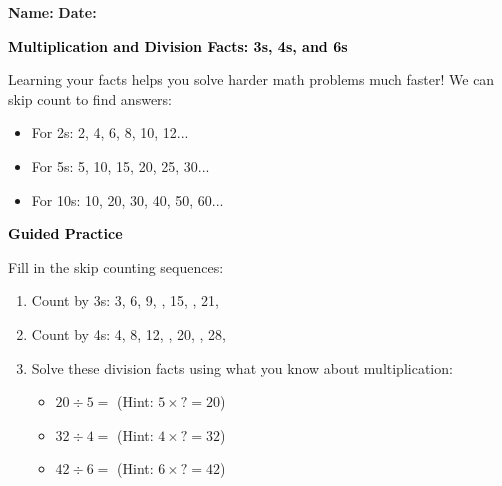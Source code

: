 \documentclass[12pt, letterpaper, fleqn]{article}
\newcommand{\blank}{\underline{\hspace{2.2cm}}}
\begin{document}
\textbf{Name:} \underline{\hspace{5cm}}
\hfill
\textbf{Date:} \underline{\hspace{3cm}}\\

\begin{tcolorbox}[colback=customteal!20]
    \large\textcolor{black}{\textbf{Multiplication and Division Facts: 3s, 4s, and 6s}}
\end{tcolorbox}

\vspace{3mm}
\noindent
Learning your facts helps you solve harder math problems much faster!
We can skip count to find answers:
\begin{itemize}
  \item For 2s: 2, 4, 6, 8, 10, 12...
  \item For 5s: 5, 10, 15, 20, 25, 30...
  \item For 10s: 10, 20, 30, 40, 50, 60...
\end{itemize}

\newpage
\begin{tcolorbox}[colback=customteal!20]
    \large\textcolor{black}{\textbf{Guided Practice}}
\end{tcolorbox}

\vspace{5mm}
\noindent
Fill in the skip counting sequences:

\vspace{5mm}
\begin{enumerate}[itemsep=2cm, leftmargin=0.6cm]
\item Count by 3s: 3, 6, 9, \blank, 15, \blank, 21, \blank
\item Count by 4s: 4, 8, 12, \blank, 20, \blank, 28, \blank
\item Solve these division facts using what you know about multiplication:
\begin{itemize}[itemsep=0.8cm]
  \item $20 \div 5 =$ \blank \quad (Hint: $5 \times \textsf{?} = 20$)
  \item $32 \div 4 =$ \blank \quad (Hint: $4 \times \textsf{?} = 32$)
  \item $42 \div 6 =$ \blank \quad (Hint: $6 \times \textsf{?} = 42$)
\end{itemize}
\end{enumerate}
\end{document}
